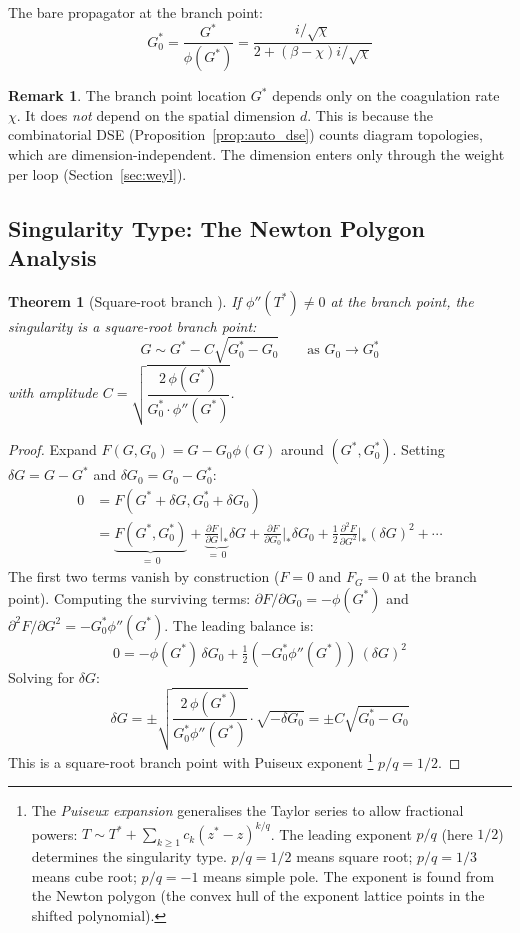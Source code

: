 \documentclass[11pt,a4paper]{article}
\newtheorem{theorem}{Theorem}[section]
\theoremstyle{definition}
\newtheorem*{remark}{Remark}
\begin{document}
The bare propagator at the branch point:
\begin{equation}
G_0^* = \frac{G^*}{\phi(G^*)} = \frac{i/\sqrt{\chi}}{2 + (\beta{-}\chi)i/\sqrt{\chi}}
\end{equation}

\begin{remark}
The branch point location $G^*$ depends only on the coagulation rate $\chi$.
It does \emph{not} depend on the spatial dimension $d$. This is because the
combinatorial DSE (Proposition~\ref{prop:auto_dse}) counts diagram topologies,
which are dimension-independent. The dimension enters only through the weight
per loop (Section~\ref{sec:weyl}).
\end{remark}

\subsection{Singularity Type: The Newton Polygon Analysis}

\begin{theorem}[Square-root branch {\cite[Prop.~VII.3]{flajolet2009}}]
\label{thm:sqrt_branch}
If $\phi''(T^*) \neq 0$ at the branch point, the singularity is a
square-root branch point:
\begin{equation}
G \sim G^* - C \sqrt{G_0^* - G_0}
\qquad\text{as } G_0 \to G_0^*
\label{eq:sqrt_expansion}
\end{equation}
with amplitude $C = \sqrt{\dfrac{2\,\phi(G^*)}{G_0^* \cdot \phi''(G^*)}}$.
\end{theorem}

\begin{proof}
Expand $F(G, G_0) = G - G_0 \phi(G)$ around $(G^*, G_0^*)$.
Setting $\delta G = G - G^*$ and $\delta G_0 = G_0 - G_0^*$:
\begin{align*}
0 &= F(G^* + \delta G, G_0^* + \delta G_0) \\
  &= \underbrace{F(G^*, G_0^*)}_{=\,0}
   + \underbrace{\frac{\partial F}{\partial G}\bigg|_*}_{=\,0} \delta G
   + \frac{\partial F}{\partial G_0}\bigg|_* \delta G_0
   + \frac{1}{2}\frac{\partial^2 F}{\partial G^2}\bigg|_* (\delta G)^2
   + \cdots
\end{align*}
The first two terms vanish by construction ($F = 0$ and $F_G = 0$ at the
branch point). Computing the surviving terms:
$\partial F / \partial G_0 = -\phi(G^*)$ and
$\partial^2 F / \partial G^2 = -G_0^* \phi''(G^*)$.
The leading balance is:
\[
0 = -\phi(G^*)\, \delta G_0 + \tfrac{1}{2}(-G_0^* \phi''(G^*))\, (\delta G)^2
\]
Solving for $\delta G$:
\[
\delta G = \pm \sqrt{\frac{2\,\phi(G^*)}{G_0^* \phi''(G^*)}} \cdot \sqrt{-\delta G_0}
= \pm C \sqrt{G_0^* - G_0}
\]
This is a square-root branch point with Puiseux exponent%
\footnote{The \emph{Puiseux expansion} generalises the Taylor series to allow
fractional powers: $T \sim T^* + \sum_{k \geq 1} c_k (z^* - z)^{k/q}$.
The leading exponent $p/q$ (here $1/2$) determines the singularity type.
$p/q = 1/2$ means square root; $p/q = 1/3$ means cube root; $p/q = -1$
means simple pole. The exponent is found from the Newton polygon (the
convex hull of the exponent lattice points in the shifted polynomial).}
$p/q = 1/2$.
\end{proof}
\end{document}
